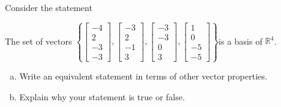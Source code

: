 
\begin{exerciseStatement}


Consider the statement 
\begin{center}\begin{minipage}{0.8\textwidth}
 The set of vectors \( \left\{ \left[\begin{array}{c}
-4 \\
2 \\
-3 \\
-3
\end{array}\right] , \left[\begin{array}{c}
-3 \\
2 \\
-1 \\
3
\end{array}\right] , \left[\begin{array}{c}
-3 \\
-3 \\
0 \\
3
\end{array}\right] , \left[\begin{array}{c}
1 \\
0 \\
-5 \\
-5
\end{array}\right] \right\} \)is a basis of \(\mathbb{R}^4\). 
\end{minipage}\end{center}
    


\begin{enumerate}[(a)]
\item  Write an equivalent statement in terms of other vector properties.
\item  Explain why your statement is true or false.
\end{enumerate}
    
\end{exerciseStatement}
    
